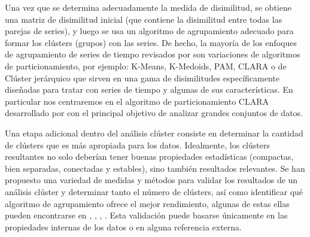 \documentclass[12pt,oneside]{book}\usepackage[]{graphicx}\usepackage[]{color}
\theoremstyle{definition} %
\begin{document}
Una vez que se determina adecuadamente la medida de disimilitud, se obtiene una matriz de disimilitud inicial (que contiene la disimilitud entre todas las parejas de series), y luego se usa un algoritmo de agrupamiento adecuado para formar los clústers (grupos) con las series. De hecho, la mayoría de los enfoques de agrupamiento de series de tiempo revisados por  \citeauthor{liao2005clustering}  \citeyear{liao2005clustering} son variaciones de algoritmos de particionamiento, por ejemplo: K-Means, K-Medoids, PAM, CLARA \citeauthor{kaufman1986clustering} \citeyear{kaufman1986clustering}  o de Clúster jerárquico que sirven en una gama de disimilitudes específicamente diseñadas para tratar con series de tiempo y algunas de sus características. 
En particular nos centraremos en el algoritmo de particionamiento CLARA desarrollado por  \citeauthor{kaufman1990finding} \citeyear{kaufman1990finding} con el principal objetivo de analizar grandes conjuntos de datos.


Una etapa adicional dentro del análisis clúster consiste en determinar la cantidad de clústers que es más apropiada para los datos. Idealmente, los clústers resultantes no solo deberían tener buenas propiedades estadísticas (compactas, bien separadas, conectadas y estables), sino también resultados relevantes. Se han propuesto una variedad de medidas y métodos para validar los resultados de un análisis clúster y determinar tanto el número de clústers, así como identificar qué algoritmo de agrupamiento ofrece el mejor rendimiento, algunas de estas ellas pueden encontrarse en \citeauthor{fraley1998many} \citeyear{fraley1998many}, \citeauthor{duda2001pattern} \citeyear{duda2001pattern}, \citeauthor{kerr2001bootstrapping} \citeyear{kerr2001bootstrapping}, \citeauthor{salvador2004determining} \citeyear{salvador2004determining}. Esta validación puede basarse únicamente en las propiedades internas de los datos o en alguna referencia externa.
\end{document}

